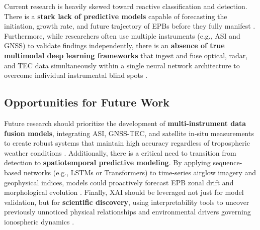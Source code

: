 Current research is heavily skewed toward reactive classification and detection. There is a \textbf{stark lack of predictive models} capable of forecasting the initiation, growth rate, and future trajectory of EPBs before they fully manifest \cite{siddiqui2025enhanced}. Furthermore, while researchers often use multiple instruments (e.g., ASI and GNSS) to validate findings independently, there is an \textbf{absence of true multimodal deep learning frameworks} that ingest and fuse optical, radar, and TEC data simultaneously within a single neural network architecture to overcome individual instrumental blind spots \cite{siddiqui2025enhanced}.

\subsection{Opportunities for Future Work}\label{subsec:opportunities-for-future-work}

Future research should prioritize the development of \textbf{multi-instrument data fusion models}, integrating ASI, GNSS-TEC, and satellite in-situ measurements to create robust systems that maintain high accuracy regardless of tropospheric weather conditions \cite{siddiqui2025enhanced}. Additionally, there is a critical need to transition from detection to \textbf{spatiotemporal predictive modeling}. By applying sequence-based networks (e.g., LSTMs or Transformers) to time-series airglow imagery and geophysical indices, models could proactively forecast EPB zonal drift and morphological evolution \cite{siddiqui2025enhanced}. Finally, XAI should be leveraged not just for model validation, but for \textbf{scientific discovery}, using interpretability tools to uncover previously unnoticed physical relationships and environmental drivers governing ionospheric dynamics \cite{siddiqui2025enhanced}.
